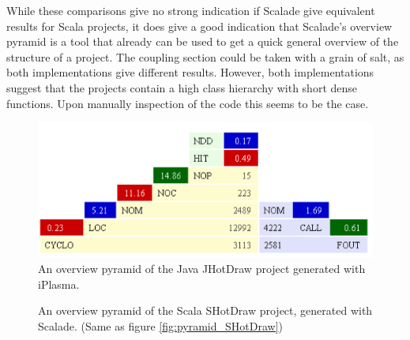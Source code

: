 \documentclass[onecolumn]{article}
\begin{document}
While these comparisons give no strong indication if Scalade give equivalent results for Scala projects, it does give a good indication that Scalade's overview pyramid is a tool that already can be used to get a quick general overview of the structure of a project. The coupling section could be taken with a grain of salt, as both implementations give different results. However, both implementations suggest that the projects contain a high class hierarchy with short dense functions. Upon manually inspection of the code this seems to be the case. 
\begin{figure}[H]
  \centering
  \includegraphics[width=\linewidth]{fig/JHotDraw_iPlasma.png}
  \caption{An overview pyramid of the Java JHotDraw project generated with iPlasma.}
  \label{fig:JHotDraw_iPlasma}
\end{figure}

\begin{figure}[H]
  \centering
  
  \caption{An overview pyramid of the Scala SHotDraw project, generated with Scalade. (Same as figure \ref{fig:pyramid_SHotDraw})}
  \label{fig:pyramid_SHotDraw_Again}
\end{figure}
\end{document}
